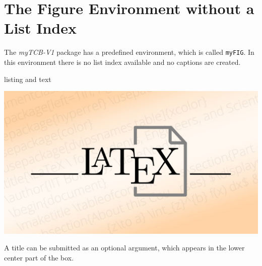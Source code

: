 \documentclass[]{myHOWTO-V001}
\begin{document}
%
%

\section{The Figure Environment without a List Index}

The \emph{myTCB-V1} package has a predefined environment, which is called \Verb|myFIG|. In this environment there is no list index available and no captions are created.

\begin{myTEXEXdoclst}{}{listing and text}
\setlength{\parskip}{3mm}

\lipsum[4]

\qquad
\begin{myFIG}{}
	\includegraphics[scale=0.15]{LaTeX.jpg}
\end{myFIG}

\lipsum[2]
\end{myTEXEXdoclst}

\newpage

A title can be submitted as an optional argument, which appears in the lower center part of the box.
\end{document}
